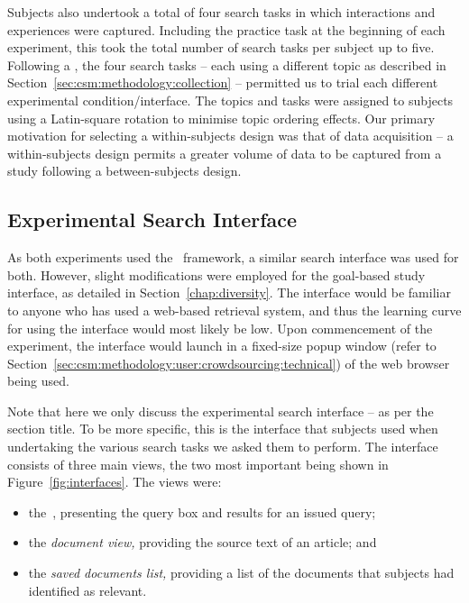 Subjects also undertook a total of four search tasks in which interactions and experiences were captured. Including the practice task at the beginning of each experiment, this took the total number of search tasks per subject up to five. Following a , the four search tasks -- each using a different topic as described in Section~\ref{sec:csm:methodology:collection} -- permitted us to trial each different experimental condition/interface. The topics and tasks were assigned to subjects using a Latin-square rotation to minimise topic ordering effects. Our primary motivation for selecting a within-subjects design was that of data acquisition -- a within-subjects design permits a greater volume of data to be captured from a study following a between-subjects design.

\subsection{Experimental Search Interface}\label{sec:csm:methodology:user:interface}
As both experiments used the \treconomics~framework, a similar search interface was used for both. However, slight modifications were employed for the goal-based study interface, as detailed in Section~\ref{chap:diversity}. The interface would be familiar to anyone who has used a web-based retrieval system, and thus the learning curve for using the interface would most likely be low. Upon commencement of the experiment, the interface would launch in a fixed-size popup window (refer to Section~\ref{sec:csm:methodology:user:crowdsourcing:technical}) of the web browser being used.

Note that here we only discuss the experimental search interface -- as per the section title. To be more specific, this is the interface that subjects used when undertaking the various search tasks we asked them to perform. The interface consists of three main views, the two most important being shown in Figure~\ref{fig:interfaces}. The views were:

\begin{itemize}
    \item{the~, presenting the query box and results for an issued query;}
    \item{the \emph{document view,} providing the source text of an article; and}
    \item{the \emph{saved documents list,} providing a list of the documents that subjects had identified as relevant.}
\end{itemize}

